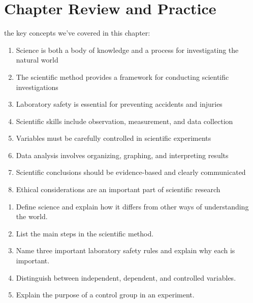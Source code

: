 \documentclass[justified,notoc]{tufte-book}
\newenvironment{tieredquestions}[1]{%
    \begin{tcolorbox}[colback=note!30,colframe=note!50,title=\textbf{Practice Questions - #1}]
}{%
    \end{tcolorbox}
}
\begin{document}
\section{Chapter Review and Practice}

 the key concepts we've covered in this chapter:

\begin{enumerate}
    \item Science is both a body of knowledge and a process for investigating the natural world
    \item The scientific method provides a framework for conducting scientific investigations
    \item Laboratory safety is essential for preventing accidents and injuries
    \item Scientific skills include observation, measurement, and data collection
    \item Variables must be carefully controlled in scientific experiments
    \item Data analysis involves organizing, graphing, and interpreting results
    \item Scientific conclusions should be evidence-based and clearly communicated
    \item Ethical considerations are an important part of scientific research
\end{enumerate}

\begin{tieredquestions}{Level 1 - Basic Understanding}
\begin{enumerate}
    \item Define science and explain how it differs from other ways of understanding the world.
    \item List the main steps in the scientific method.
    \item Name three important laboratory safety rules and explain why each is important.
    \item Distinguish between independent, dependent, and controlled variables.
    \item Explain the purpose of a control group in an experiment.
\end{enumerate}
\end{tieredquestions}
\end{document}
